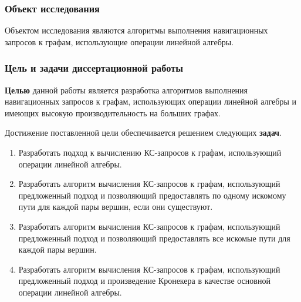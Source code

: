 
\subsubsection*{\large{Объект исследования}}

 Объектом исследования являются алгоритмы выполнения навигационных запросов к графам, использующие операции линейной алгебры.

\subsubsection*{\large{Цель и задачи диссертационной работы}}

\textbf{Целью} данной работы является разработка алгоритмов выполнения навигационных запросов к графам, использующих операции линейной алгебры и имеющих высокую производительность на больших графах.

Достижение поставленной цели обеспечивается решением следующих \textbf{задач}.
\begin{enumerate}
	\item Разработать подход к вычислению КС-запросов к графам, использующий операции линейной алгебры.
	\item Разработать алгоритм вычисления КС-запросов к графам, использующий предложенный подход и позволяющий предоставлять по одному искомому пути для каждой пары вершин, если они существуют.
	\item Разработать алгоритм вычисления КС-запросов к графам, использующий предложенный подход и позволяющий предоставлять все искомые пути для каждой пары вершин.
	\item Разработать алгоритм вычисления КС-запросов к графам, использующий предложенный подход и произведение Кронекера в качестве основной операции линейной алгебры.
\end{enumerate}


